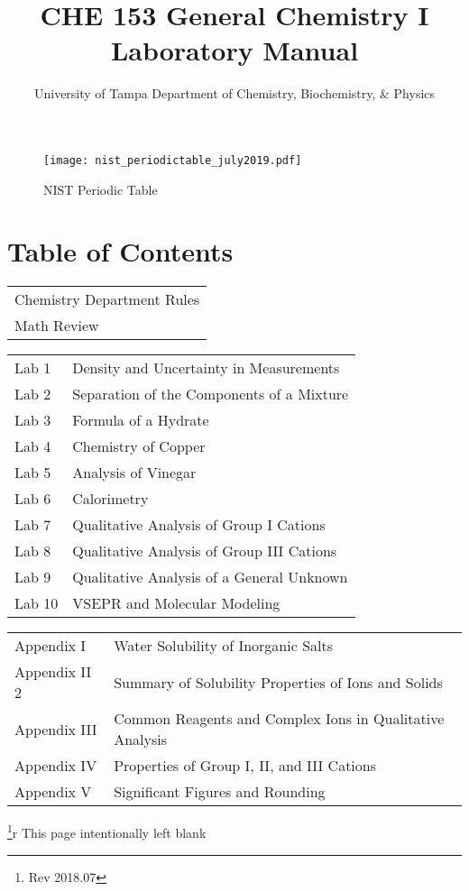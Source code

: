 \documentclass[12pt]{article}
\title{CHE 153 General Chemistry I Laboratory Manual}
\author{University of Tampa Department of Chemistry, Biochemistry, \& Physics}
\begin{document}
\maketitle
\newpage
\begin{figure}[htp]
    \centering
    \texttt{[image: nist\_periodictable\_july2019.pdf]}
    \caption{NIST Periodic Table}
    \label{fig:NIST periodic table}
\end{figure}
\newpage
\section{\large Table of Contents}
\begin{center}
\begin{tabular}{ l }
Chemistry Department Rules\\
Math Review\\
\end{tabular}
\end{center}
\begin{center}
\begin{tabular}{ l l } 
 Lab 1 & Density and Uncertainty in Measurements \\ 
 Lab 2 & Separation of the Components of a Mixture \\ 
 Lab 3 & Formula of a Hydrate \\
 Lab 4 & Chemistry of Copper\\ 
 Lab 5 & Analysis of Vinegar\\ 
 Lab 6 & Calorimetry\\
 Lab 7 & Qualitative Analysis of Group I Cations\\ 
 Lab 8 & Qualitative Analysis of Group III Cations\\ 
 Lab 9 & Qualitative Analysis of a General Unknown\\
 Lab 10 & VSEPR and Molecular Modeling\\
\end{tabular}
\end{center}
\begin{center}
\begin{tabular}{ l l } 
 Appendix I & Water Solubility of Inorganic Salts\\ 
 Appendix II 2 & Summary of Solubility Properties of Ions and Solids\\ 
 Appendix III & Common Reagents and Complex Ions in Qualitative Analysis\\
 Appendix IV & Properties of Group I, II, and III Cations\\ 
 Appendix V & Significant Figures and Rounding\\
\end{tabular}
\end{center}
\footnote{Rev 2018.07}{r}
\newpage
This page intentionally left blank
\newpage
\end{document}
